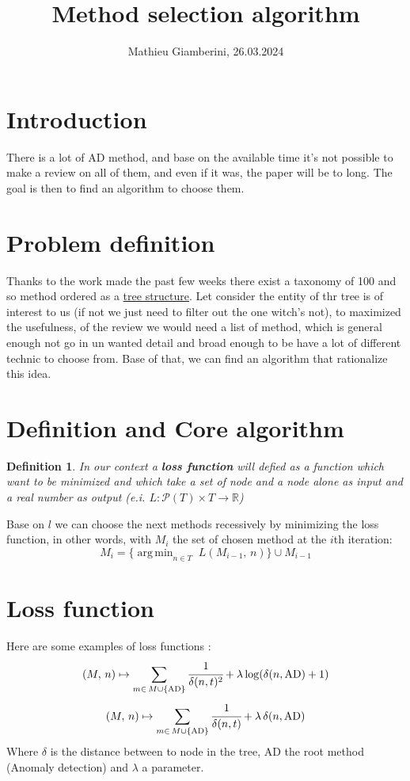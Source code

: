 \documentclass{article}
\title{Method selection algorithm}
\author{Mathieu Giamberini, 26.03.2024}
\date{}
\DeclareMathOperator*{\argmin}{arg\,min}
\newtheorem{definition}{Definition}
\begin{document}
    \maketitle
    \section*{Introduction}
        There is a lot of AD method, and base on the available time it's not possible to
        make a review on all of them, and even if it was, the paper will be to long. 
        The goal is then to find an algorithm to choose them.

    \section{Problem definition}
        Thanks to the work made the past few weeks there exist a taxonomy of 100 and so 
        method ordered as a \href{https://github.com/Mathieu-Giamberini/Anomalies_detection-literature_review/blob/main/3_Categorisation/tree.html}
        {tree structure}. Let consider the entity of thr tree is of interest to us 
        (if not we just need to filter out the one witch's not), to maximized the usefulness,
        of the review we would need a list of method, which is general enough not go in un wanted detail and 
        broad enough to be have a lot of different technic to choose from. Base of that, we can find an algorithm
        that rationalize this idea.

    \section{Definition and Core algorithm}
        \begin{definition}
            In our context a \textbf{loss function} will defied as a function which want to be minimized 
            and which take a set of node and a node alone as input and a real number as output 
            (e.i. $L: \mathcal{P} (T) \times T \to \mathbb{R} $) 
        \end{definition}
        Base on $l$ we can choose the next methods recessively by minimizing the loss function, in other words,
        with $M_i$ the set of chosen method at the $i$th iteration:
        \[M_i = \{\argmin_{n \in T} \; L(M_{i-1}, \,n)\} \cup M_{i-1}\]     
        
    \section{Loss function}
        Here are some examples of loss functions :
        \[(M, \,n) \mapsto \sum_{m \in \,M \cup \{\text{AD}\}} \cfrac{1}{\delta(n, t)^2} + \lambda \log(\delta(n, \text{AD}) + 1)\]
        \[(M, \,n) \mapsto \sum_{m \in \,M \cup \{\text{AD}\}} \cfrac{1}{\delta(n, t)} + \lambda \,\delta(n, \text{AD}) \]
        Where $\delta$ is the distance between to node in the tree, AD the root method (Anomaly detection) and $\lambda$ a parameter. 
\end{document}

